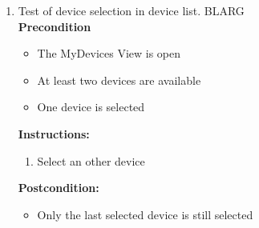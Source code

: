 \documentclass[a4paper]{article}
\newlength{\testlabellength}
\newenvironment{testlist}{\begin{enumerate}[label=\bfseries Instruction \thesubsection.\arabic* , labelindent=0pt, labelwidth=\testlabellength , leftmargin=2cm]}{\end{enumerate}}
\newenvironment{precondition}{
{\color{white}BLARG}\\ 
\textbf{Precondition}
\begin{itemize}[labelindent=0cm, labelwidth=2cm , leftmargin=1cm]
}
{\end{itemize}}
\newenvironment{instruction}{
\textbf{Instructions:}
\begin{enumerate}[label=\bfseries  \arabic*., labelindent=0cm, labelwidth=2cm , leftmargin=1cm]
}
{\end{enumerate}}
\newenvironment{postcondition}{
\textbf{Postcondition:}
\begin{itemize}[labelindent=0cm, labelwidth=2cm , leftmargin=1cm]
}
{\end{itemize}}
\begin{document}
\begin{appendices}
\begin{testlist}
    \item Test of device selection in device list.
   		\begin{precondition}
   			\item The MyDevices View is open
   			\item At least two devices are available
   			\item One device is selected
   		\end{precondition}
   		\begin{instruction}
   			\item Select an other device
   		\end{instruction}
   		\begin{postcondition}
   			\item Only the last selected device is still selected
   		\end{postcondition}
    

\end{testlist}
\end{appendices}
\end{document}

